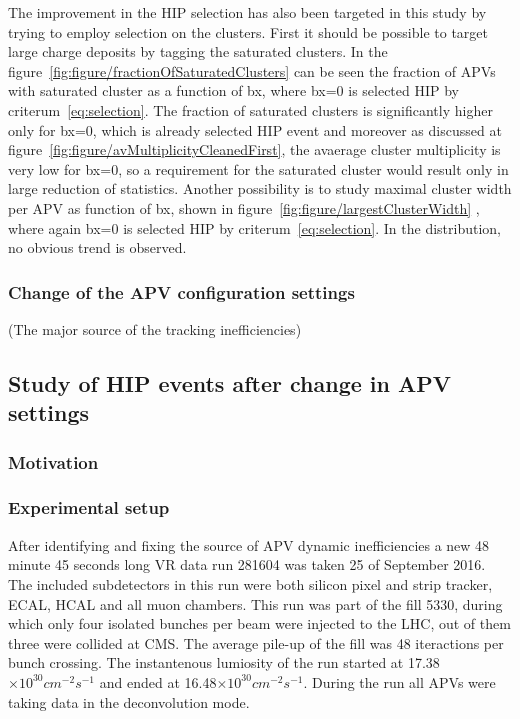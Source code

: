 The improvement in the HIP selection has also been targeted in this study by trying to employ selection on the clusters. First it should be possible to target large charge deposits by tagging the saturated clusters. In the figure~\ref{fig:figure/fractionOfSaturatedClusters} can be  seen the fraction of APVs with saturated cluster as a function of bx, where bx=0 is selected HIP by criterum~\ref{eq:selection}. The fraction of saturated clusters is significantly higher only for bx=0, which is already selected HIP event and moreover as discussed at figure~\ref{fig:figure/avMultiplicityCleanedFirst}, the avaerage cluster multiplicity is very low for bx=0, so a requirement for the saturated cluster would result only in large reduction of statistics. Another possibility is to study maximal cluster width per APV as function of bx, shown in figure~\ref{fig:figure/largestClusterWidth} , where again bx=0 is selected HIP by criterum~\ref{eq:selection}. In the distribution, no obvious trend is observed. 



\subsubsection{Change of the APV configuration settings}
          (The major source of the tracking inefficiencies)

\subsection{Study of HIP events after change in APV settings}

\subsubsection{Motivation}


\subsubsection{Experimental setup}

After identifying and fixing the source of APV dynamic inefficiencies a new 48 minute 45 seconds long VR data run 281604 was taken 25 of September 2016. The included subdetectors in this run were both silicon pixel and strip tracker, ECAL, HCAL and all muon chambers. This run was part of the fill 5330, during which only four isolated bunches per beam were injected to the LHC, out of them three were collided at CMS. The average pile-up of the fill was 48 iteractions per bunch crossing. The instantenous lumiosity of the run started at 17.38$\times 10^{30} cm^{-2} s^{-1}$ and ended at 16.48$\times 10^{30} cm^{-2} s^{-1}$. During the run all APVs were taking data in the deconvolution mode. 

